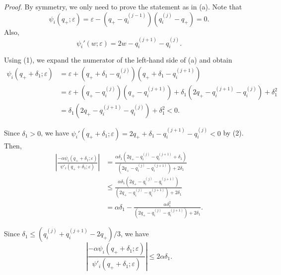 \documentclass[10pt,a4paper]{article}
\begin{document}

\textit{Proof.} By symmetry, we only need to prove the statement as in (a). Note that
  $$\psi_i(q_+;\varepsilon)=\varepsilon-(q_+-q_i^{(j-1)})(q_i^{(j)}-q_+)=0.$$
Also, $$\psi_i'(w;\varepsilon)=2w-q_i^{(j+1)}-q_i^{(j)}.$$


Using (1), we expand the numerator of the left-hand side of (a) and obtain
$$\begin{aligned}
    \psi_i(q_++\delta_1;\varepsilon) & =\varepsilon+(q_++\delta_1-q_i^{(j)})(q_++\delta_1-q_i^{(j+1)})                               \\
                                          & =\varepsilon+(q_+-q_i^{(j)})(q_+-q_i^{(j+1)})+\delta_1(2q_+-q_i^{(j+1)}-q_i^{(j)})+\delta_1^2 \\
                                          & =\delta_1(2q_+-q_i^{(j+1)}-q_i^{(j)})+\delta_1^2<0.
  \end{aligned}$$

Since $\delta_1>0$, we have $\psi_i'(q_++\delta_1;\varepsilon)=2q_++\delta_1-q_i^{(j+1)}-q_i^{(j)}<0$ by (2). Then,
$$\begin{aligned}\left\lvert \frac{-\alpha\psi_i(q_++\delta_1;\varepsilon)}{\psi'_i(q_++\delta_1;\varepsilon)}\right\rvert & =\frac{\alpha\delta_1(2q_+-q_i^{(j)}-q_i^{(j+1)}+\delta_1)}{(2q_+-q_i^{(j)}-q_i^{(j+1)})+2\delta_1} \\
                                                                                                                                   & \leq \frac{\alpha\delta_1(2q_+-q_i^{(j)}-q_i^{(j+1)})}{(2q_+-q_i^{(j)}-q_i^{(j+1)})+2\delta_1}           \\
                                                                                                                                   & =\alpha\delta_1-\frac{\alpha\delta_1^2}{(2q_+-q_i^{(j)}-q_i^{(j+1)})+2\delta_1}.\end{aligned}$$

Since $\delta_1\leq (q_i^{(j)}+q_i^{(j+1)}-2q_+)/3$, we have $$\left\lvert \frac{-\alpha\psi_i(q_++\delta_1;\varepsilon)}{\psi'_i(q_++\delta_1;\varepsilon)}\right\rvert\leq 2\alpha\delta_1.$$
\end{document}
